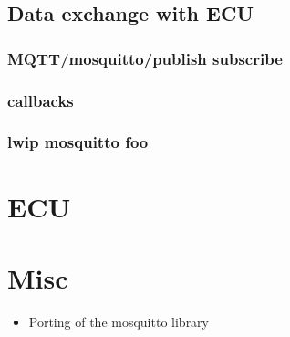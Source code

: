 \documentclass[paper=a4, fontsize=11pt]{scrartcl}
\begin{document}
\subsection{Data exchange with ECU}
  \subsubsection{MQTT/mosquitto/publish subscribe}
  \subsubsection{callbacks}
  \subsubsection{lwip mosquitto foo}
\section{ECU}
\section{Misc}
\begin{itemize}
  \item Porting of the mosquitto library %
\end{itemize}
\end{document}
